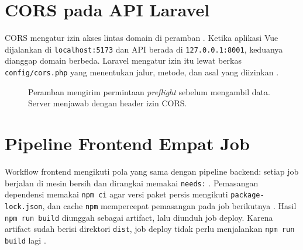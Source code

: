 \documentclass[a4paper,oneside,12pt]{report}
\begin{document}
\section{CORS pada API Laravel}
CORS mengatur izin akses lintas domain di peramban \cite{mdn-cors}. Ketika aplikasi Vue dijalankan di \texttt{localhost:5173} dan API berada di \texttt{127.0.0.1:8001}, keduanya dianggap domain berbeda. Laravel mengatur izin itu lewat berkas \texttt{config/cors.php} yang menentukan jalur, metode, dan asal yang diizinkan \cite{laravel-cors}.

\begin{figure}[H]
    \centering
    \caption{Peramban mengirim permintaan \textit{preflight} sebelum mengambil data. Server menjawab dengan header izin CORS.}
    \label{fig:cors-flow}
\end{figure}

\section{Pipeline Frontend Empat Job}
Workflow frontend mengikuti pola yang sama dengan pipeline backend: setiap job berjalan di mesin bersih dan dirangkai memakai \texttt{needs:} \cite{github-actions}. Pemasangan dependensi memakai \texttt{npm ci} agar versi paket persis mengikuti \texttt{package-lock.json}, dan cache \texttt{npm} mempercepat pemasangan pada job berikutnya \cite{github-node}. Hasil \texttt{npm run build} diunggah sebagai artifact, lalu diunduh job deploy. Karena artifact sudah berisi direktori \texttt{dist}, job deploy tidak perlu menjalankan \texttt{npm run build} lagi \cite{github-artifacts}.
\end{document}
